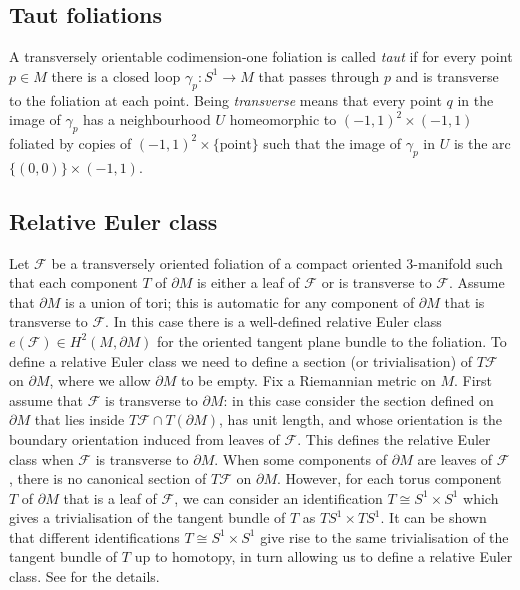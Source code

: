 \documentclass[11pt]{amsart}
\theoremstyle{remark}
\theoremstyle{definition}
\begin{document}
	\subsection{Taut foliations}
	A transversely orientable codimension-one foliation is called \emph{taut} if for every point $p \in M$ there is a closed loop $\gamma_p \colon S^1 \rightarrow M$ that passes through $p$ and is transverse to the foliation at each point. Being \emph{transverse} means that every point $q$ in the image of $\gamma_p$ has a neighbourhood $U $ homeomorphic to $(-1, 1)^2 \times (-1, 1)$ foliated by copies of $(-1, 1)^2 \times \{ \text{point} \}$ such that the image of $\gamma_p$ in $U$ is the arc $\{ (0, 0) \} \times (-1, 1)$. 
	
	
	
	
	\subsection{Relative Euler class}
	Let $\mathcal{F}$ be a transversely oriented foliation of a compact oriented 3-manifold such that each component $T$ of $\partial M$ is either a leaf of $\mathcal{F}$ or is transverse to $\mathcal{F}$. Assume that $\partial M$ is a union of tori; this is automatic for any component of $\partial M$ that is transverse to $\mathcal{F}$. In this case there is a well-defined relative Euler class $e(\mathcal{F}) \in H^2(M , \partial M)$ for the oriented tangent plane bundle to the foliation. To define a relative Euler class we need to define a section (or trivialisation) of $T \mathcal{F}$ on $\partial M$, where we allow $\partial M$ to be empty. Fix a Riemannian metric on $M$. First assume that $\mathcal{F}$ is transverse to $\partial M$: in this case consider the section defined on $\partial M$ that lies inside $T \mathcal{F} \cap T(\partial M)$, has unit length, and whose orientation is the boundary orientation induced from leaves of $\mathcal{F}$. This defines the relative Euler class when $\mathcal{F}$ is transverse to $\partial M$. When some components of $\partial M$ are leaves of $\mathcal{F}$, there is no canonical section of $T \mathcal{F}$ on $\partial M$. However, for each torus component $T$ of $\partial M$ that is a leaf of $\mathcal{F}$, we can consider an identification $T \cong S^1 \times S^1$ which gives a trivialisation of the tangent bundle of $T$ as $TS^1 \times TS^1$. It can be shown that different identifications $T \cong S^1 \times S^1$ give rise to the same trivialisation of the tangent bundle of $T$ up to homotopy, in turn allowing us to define a relative Euler class.  See \cite[Section 3]{yazdi2020thurston} for the details. 
\end{document}
